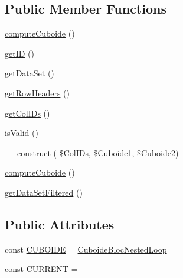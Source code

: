 \subsection*{Public Member Functions}
\begin{DoxyCompactItemize}
\item 
\hyperlink{class_cuboide_emergent_affd999bbc9889ce2746e485aea1973e3}{compute\+Cuboide} ()
\item 
\hyperlink{class_cuboide_emergent_ab6bb8212e197a7a281f6078ef50fb3b9}{get\+ID} ()
\item 
\hyperlink{class_cuboide_emergent_a389c7cc353b142da7ed31dadf3598e68}{get\+Data\+Set} ()
\item 
\hyperlink{class_cuboide_emergent_aa67c2831cafde1f6fd35ca0de28c3d53}{get\+Row\+Headers} ()
\item 
\hyperlink{class_cuboide_emergent_ad123a72b18f459e04cfdd809ea89e8f0}{get\+Col\+I\+Ds} ()
\item 
\hyperlink{class_cuboide_emergent_a3d0507e67863ed9ca9398ffbc6381c53}{is\+Valid} ()
\item 
\hyperlink{class_cuboide_emergent_a1d8825c7b39273e211f0615a17f5bfff}{\+\_\+\+\_\+construct} ( \$Col\+I\+Ds, \$Cuboide1, \$Cuboide2)
\item 
\hyperlink{class_cuboide_emergent_affd999bbc9889ce2746e485aea1973e3}{compute\+Cuboide} ()
\item 
\hyperlink{class_cuboide_emergent_aacc1b18d0fe89d98175eec66ddc15d8d}{get\+Data\+Set\+Filtered} ()
\end{DoxyCompactItemize}
\subsection*{Public Attributes}
\begin{DoxyCompactItemize}
\item 
const \hyperlink{class_cuboide_emergent_ad213f6b634d8c888c59418a7cd0dee90}{C\+U\+B\+O\+I\+DE} = \textquotesingle{}\hyperlink{class_cuboide_bloc_nested_loop}{Cuboide\+Bloc\+Nested\+Loop}\textquotesingle{}
\item 
const \hyperlink{class_cuboide_emergent_a7b90f304497d08479a309ffa9a2cedb8}{C\+U\+R\+R\+E\+NT} = \textquotesingle{}\textquotesingle{}
\end{DoxyCompactItemize}
